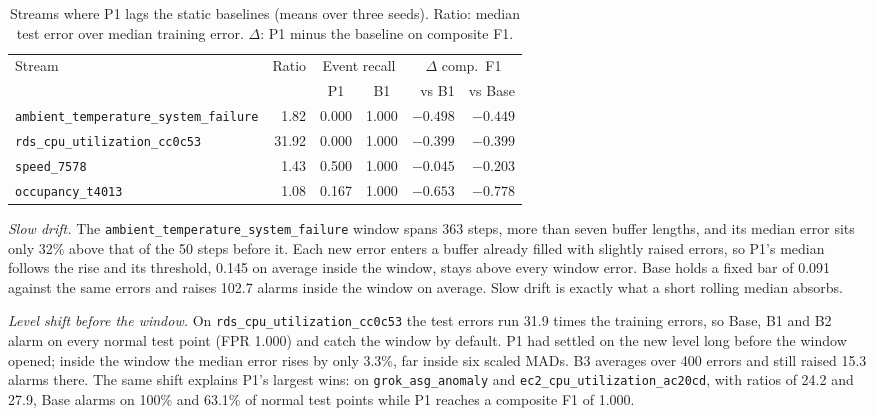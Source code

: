 \documentclass[conference]{IEEEtran}
\begin{document}
\begin{table}[t]
\centering
\caption{Streams where P1 lags the static baselines (means over three seeds). Ratio: median test error over median training error. $\Delta$: P1 minus the baseline on composite F1.}
\label{tab:failure}
\footnotesize
\setlength{\tabcolsep}{3pt}
\begin{tabular}{@{}>{\raggedright\arraybackslash}p{2.35cm}rccrr@{}}
\toprule
Stream & Ratio & \multicolumn{2}{c}{Event recall} & \multicolumn{2}{c}{$\Delta$ comp.\ F1} \\
 & & P1 & B1 & vs B1 & vs Base \\
\midrule
\texttt{ambient\_\allowbreak temperature\_\allowbreak system\_\allowbreak failure} & 1.82 & 0.000 & 1.000 & $-0.498$ & $-0.449$ \\
\texttt{rds\_\allowbreak cpu\_\allowbreak utilization\_\allowbreak cc0c53} & 31.92 & 0.000 & 1.000 & $-0.399$ & $-0.399$ \\
\texttt{speed\_7578} & 1.43 & 0.500 & 1.000 & $-0.045$ & $-0.203$ \\
\texttt{occupancy\_\allowbreak t4013} & 1.08 & 0.167 & 1.000 & $-0.653$ & $-0.778$ \\
\bottomrule
\end{tabular}
\end{table}

\emph{Slow drift.} The \texttt{ambient\_\allowbreak temperature\_\allowbreak system\_\allowbreak failure} window spans 363 steps, more than seven buffer lengths, and its median error sits only 32\% above that of the 50 steps before it. Each new error enters a buffer already filled with slightly raised errors, so P1's median follows the rise and its threshold, 0.145 on average inside the window, stays above every window error. Base holds a fixed bar of 0.091 against the same errors and raises 102.7 alarms inside the window on average. Slow drift is exactly what a short rolling median absorbs.

\emph{Level shift before the window.} On \texttt{rds\_\allowbreak cpu\_\allowbreak utilization\_\allowbreak cc0c53} the test errors run 31.9 times the training errors, so Base, B1 and B2 alarm on every normal test point (FPR 1.000) and catch the window by default. P1 had settled on the new level long before the window opened; inside the window the median error rises by only 3.3\%, far inside six scaled MADs. B3 averages over 400 errors and still raised 15.3 alarms there. The same shift explains P1's largest wins: on \texttt{grok\_\allowbreak asg\_\allowbreak anomaly} and \texttt{ec2\_\allowbreak cpu\_\allowbreak utilization\_\allowbreak ac20cd}, with ratios of 24.2 and 27.9, Base alarms on 100\% and 63.1\% of normal test points while P1 reaches a composite F1 of 1.000.
\end{document}
